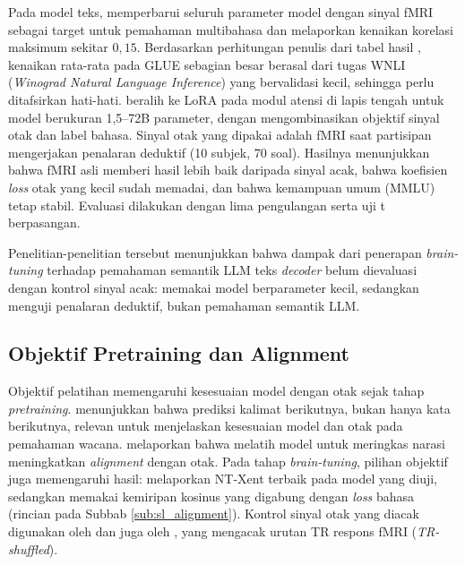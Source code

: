 Pada model teks, \textcite{negi2025brain} memperbarui seluruh parameter model dengan sinyal fMRI sebagai target untuk pemahaman multibahasa dan melaporkan kenaikan korelasi maksimum sekitar $0{,}15$. Berdasarkan perhitungan penulis dari tabel hasil \textcite{negi2025brain}, kenaikan rata-rata pada GLUE sebagian besar berasal dari tugas WNLI (\textit{Winograd Natural Language Inference}) yang bervalidasi kecil, sehingga perlu ditafsirkan hati-hati. %
\textcite{xiao2026beyond} beralih ke LoRA pada modul atensi di lapis tengah untuk model berukuran 1,5--72B parameter, dengan mengombinasikan objektif sinyal otak dan label bahasa. Sinyal otak yang dipakai adalah fMRI saat partisipan mengerjakan penalaran deduktif (10 subjek, 70 soal). Hasilnya menunjukkan bahwa fMRI asli memberi hasil lebih baik daripada sinyal acak, bahwa koefisien \textit{loss} otak yang kecil sudah memadai, dan bahwa kemampuan umum (MMLU) tetap stabil. Evaluasi dilakukan dengan lima pengulangan serta uji t berpasangan.

Penelitian-penelitian tersebut menunjukkan bahwa dampak dari penerapan \textit{brain-tuning} terhadap pemahaman semantik LLM teks \textit{decoder} belum dievaluasi dengan kontrol sinyal acak: \textcite{negi2025brain} memakai model berparameter kecil, sedangkan \textcite{xiao2026beyond} menguji penalaran deduktif, bukan pemahaman semantik LLM.

\subsection{Objektif Pretraining dan Alignment}
\label{sub:plt_objektif}

Objektif pelatihan memengaruhi kesesuaian model dengan otak sejak tahap \textit{pretraining}. \textcite{yu2024predicting} menunjukkan bahwa prediksi kalimat berikutnya, bukan hanya kata berikutnya, relevan untuk menjelaskan kesesuaian model dan otak pada pemahaman wacana. \textcite{aw2023traininglanguagemodelssummarize} melaporkan bahwa melatih model untuk meringkas narasi meningkatkan \textit{alignment} dengan otak. %
Pada tahap \textit{brain-tuning}, pilihan objektif juga memengaruhi hasil: \textcite{negi2025brain} melaporkan NT-Xent \autocite{chen2020simple} terbaik pada model yang diuji, sedangkan \textcite{xiao2026beyond} memakai kemiripan kosinus yang digabung dengan \textit{loss} bahasa (rincian pada Subbab \ref{sub:sl_alignment}). Kontrol sinyal otak yang diacak digunakan oleh \textcite{xiao2026beyond} dan juga oleh \textcite{negi2025brain}, yang mengacak urutan TR respons fMRI (\textit{TR-shuffled}). %


